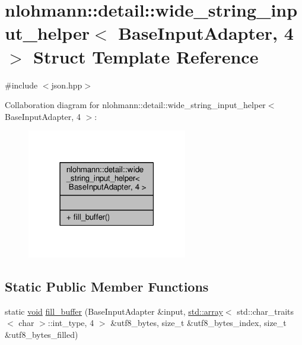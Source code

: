 \hypertarget{structnlohmann_1_1detail_1_1wide__string__input__helper_3_01BaseInputAdapter_00_014_01_4}{}\section{nlohmann\+:\+:detail\+:\+:wide\+\_\+string\+\_\+input\+\_\+helper$<$ Base\+Input\+Adapter, 4 $>$ Struct Template Reference}
\label{structnlohmann_1_1detail_1_1wide__string__input__helper_3_01BaseInputAdapter_00_014_01_4}


{\ttfamily \#include $<$json.\+hpp$>$}



Collaboration diagram for nlohmann\+:\+:detail\+:\+:wide\+\_\+string\+\_\+input\+\_\+helper$<$ Base\+Input\+Adapter, 4 $>$\+:
\nopagebreak
\begin{figure}[H]
\begin{center}
\leavevmode
\includegraphics[width=198pt]{structnlohmann_1_1detail_1_1wide__string__input__helper_3_01BaseInputAdapter_00_014_01_4__coll__graph}
\end{center}
\end{figure}
\subsection*{Static Public Member Functions}
\begin{DoxyCompactItemize}
\item 
static \hyperlink{namespacenlohmann_1_1detail_a59fca69799f6b9e366710cb9043aa77d}{void} \hyperlink{structnlohmann_1_1detail_1_1wide__string__input__helper_3_01BaseInputAdapter_00_014_01_4_a0ff95d2f31684b6477abcd783975b7c1}{fill\+\_\+buffer} (Base\+Input\+Adapter \&input, \hyperlink{namespacenlohmann_1_1detail_a1ed8fc6239da25abcaf681d30ace4985af1f713c9e000f5d3f280adbd124df4f5}{std\+::array}$<$ std\+::char\+\_\+traits$<$ char $>$\+::int\+\_\+type, 4 $>$ \&utf8\+\_\+bytes, size\+\_\+t \&utf8\+\_\+bytes\+\_\+index, size\+\_\+t \&utf8\+\_\+bytes\+\_\+filled)
\end{DoxyCompactItemize}



